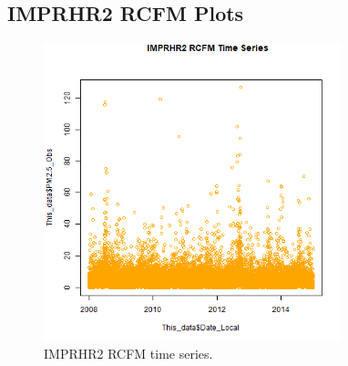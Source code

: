 
\subsection{IMPRHR2 RCFM Plots}
\begin{figure} 
\centering 
\includegraphics[width=0.77\textwidth]{Code_Outputs/IMPRHR2RCFM_time_series.png} 
\caption{\label{fig:IMPRHR2RCFMTS}IMPRHR2 RCFM time series.} 
\end{figure} 
 
